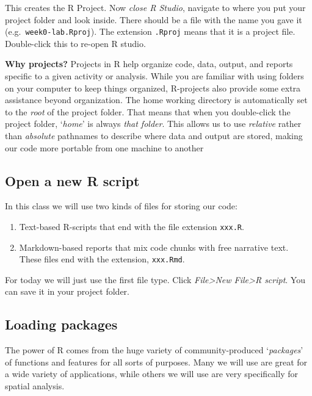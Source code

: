 \documentclass[
]{book}
\providecommand{\tightlist}{%
  \setlength{\itemsep}{0pt}\setlength{\parskip}{0pt}}
\newenvironment{rmdnote}[1]
  {
  \begin{itemize}
  \renewcommand{\labelitemi}{
    \raisebox{-.7\height}[0pt][0pt]{
      {\setkeys{Gin}{width=3em,keepaspectratio}\texttt{[image: images/\#1]}}
    }
  }
  \setlength{\fboxsep}{1em}
  \begin{note}
  \item
  }
  {
  \end{note}
  \end{itemize}
  }
\begin{document}
This creates the R Project. Now \emph{close R Studio}, navigate to where you put your project folder and look inside. There should be a file with the name you gave it (e.g.~\texttt{week0-lab.Rproj}). The extension \texttt{.Rproj} means that it is a project file. Double-click this to re-open R studio.

\begin{rmdnote}{note}
\textbf{Why projects?} Projects in R help organize code, data, output, and reports specific to a given activity or analysis. While you are familiar with using folders on your computer to keep things organized, R-projects also provide some extra assistance beyond organization. The home working directory is automatically set to the \emph{root} of the project folder. That means that when you double-click the project folder, `\emph{home}' is always \emph{that folder}. This allows us to use \emph{relative} rather than \emph{absolute} pathnames to describe where data and output are stored, making our code more portable from one machine to another

\end{rmdnote}

\hypertarget{open-a-new-r-script}{%
\subsection{Open a new R script}\label{open-a-new-r-script}}

In this class we will use two kinds of files for storing our code:

\begin{enumerate}
\def\labelenumi{\arabic{enumi}.}
\tightlist
\item
  Text-based R-scripts that end with the file extension \texttt{xxx.R}.
\item
  Markdown-based reports that mix code chunks with free narrative text. These files end with the extension, \texttt{xxx.Rmd}.
\end{enumerate}

For today we will just use the first file type. Click \emph{File\textgreater New File\textgreater R script}. You can save it in your project folder.

\hypertarget{loading-packages}{%
\subsection{Loading packages}\label{loading-packages}}

The power of R comes from the huge variety of community-produced `\emph{packages}' of functions and features for all sorts of purposes. Many we will use are great for a wide variety of applications, while others we will use are very specifically for spatial analysis.
\end{document}
